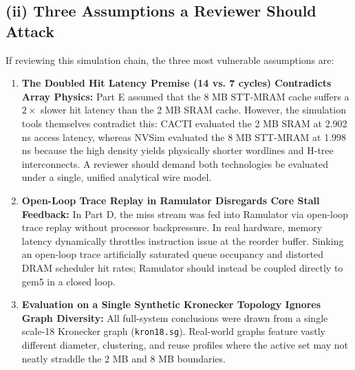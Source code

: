 \documentclass[10pt,a4paper,twocolumn]{article}
\begin{document}
\subsection*{(ii) Three Assumptions a Reviewer Should Attack}
If reviewing this simulation chain, the three most vulnerable assumptions are:
\begin{enumerate}[leftmargin=*]
    \item \textbf{The Doubled Hit Latency Premise (14 vs. 7 cycles) Contradicts Array Physics:} Part E assumed that the 8 MB STT-MRAM cache suffers a $2\times$ slower hit latency than the 2 MB SRAM cache. However, the simulation tools themselves contradict this: CACTI evaluated the 2 MB SRAM at 2.902 ns access latency, whereas NVSim evaluated the 8 MB STT-MRAM at 1.998 ns because the high density yields physically shorter wordlines and H-tree interconnects. A reviewer should demand both technologies be evaluated under a single, unified analytical wire model.
    \item \textbf{Open-Loop Trace Replay in Ramulator Disregards Core Stall Feedback:} In Part D, the miss stream was fed into Ramulator via open-loop trace replay without processor backpressure. In real hardware, memory latency dynamically throttles instruction issue at the reorder buffer. Sinking an open-loop trace artificially saturated queue occupancy and distorted DRAM scheduler hit rates; Ramulator should instead be coupled directly to gem5 in a closed loop.
    \item \textbf{Evaluation on a Single Synthetic Kronecker Topology Ignores Graph Diversity:} All full-system conclusions were drawn from a single scale-18 Kronecker graph (\texttt{kron18.sg}). Real-world graphs feature vastly different diameter, clustering, and reuse profiles where the active set may not neatly straddle the 2 MB and 8 MB boundaries.
\end{enumerate}
\end{document}
